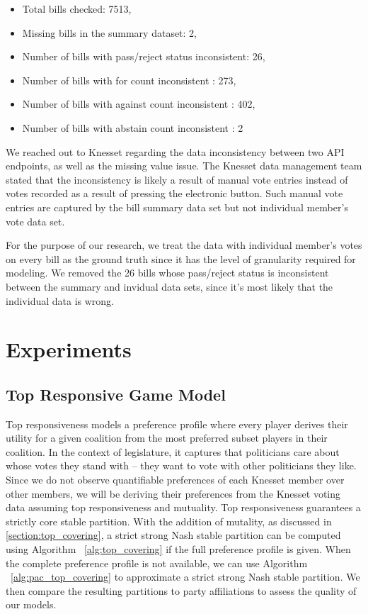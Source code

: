 \documentclass[letterpaper]{article} %
\begin{document}
\begin{itemize}
  \item Total bills checked: 7513,
  \item Missing bills in the summary dataset: 2,
  \item Number of bills with pass/reject status inconsistent: 26,
  \item Number of bills with for count inconsistent : 273,
  \item Number of bills with against count inconsistent : 402,
  \item Number of bills with abstain count inconsistent : 2
\end{itemize}

We reached out to Knesset regarding the data inconsistency between two API endpoints, as well as the missing value issue. The Knesset data management team stated that the inconsistency is likely a result of manual vote entries instead of votes recorded as a result of pressing the electronic button. Such manual vote entries are captured by the bill summary data set but not individual member's vote data set.

For the purpose of our research, we treat the data with individual member's votes on every bill as the ground truth since it has the level of granularity required for modeling. We removed the 26 bills whose pass/reject status is inconsistent between the summary and invidual data sets, since it's most likely that the individual data is wrong.

\section{Experiments}

\subsection{Top Responsive Game Model}
Top responsiveness models a preference profile where every player derives their utility for a given coalition from the most preferred subset players in their coalition. In the context of legislature, it captures that politicians care about whose votes they stand with – they want to vote with other politicians they like. Since we do not observe quantifiable preferences of each Knesset member over other members, we will be deriving their preferences from the Knesset voting data assuming top responsiveness and mutuality. Top responsiveness guarantees a strictly core stable partition. With the addition of mutality, as discussed in \ref{section:top_covering}, a strict strong Nash stable partition can be computed using Algorithm ~\ref{alg:top_covering} if the full preference profile is given. When the complete preference profile is not available, we can use Algorithm ~\ref{alg:pac_top_covering} to approximate a strict strong Nash stable partition. We then compare the resulting partitions to party affiliations to assess the quality of our models.
\end{document}
